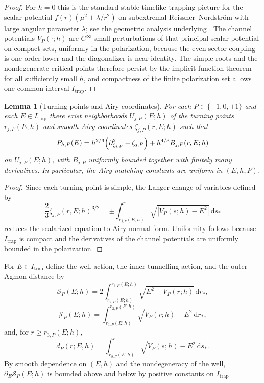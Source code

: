 \documentclass[12pt]{article}
\numberwithin{equation}{section}
\theoremstyle{plain}
\newtheorem{lemma}[theorem]{Lemma}
\theoremstyle{definition}
\theoremstyle{remark}
\newcommand{\dd}{\mathrm d}
\newcommand{\abs}[1]{\left|#1\right|}
\begin{document}
\begin{proof}
For $h=0$ this is the standard stable timelike trapping picture for the scalar potential $f(r)(\mu^2+\lambda/r^2)$ on subextremal Reissner--Nordstr\"om with large angular parameter $\lambda$; see the geometric analysis underlying \cite{ShlapentokhRothmanVanDeMoortel2026}.  The channel potentials $V_P(\cdot;h)$ are $C^\infty$-small perturbations of that principal scalar potential on compact sets, uniformly in the polarization, because the even-sector coupling is one order lower and the diagonalizer is near identity.  The simple roots and the nondegenerate critical points therefore persist by the implicit-function theorem for all sufficiently small $h$, and compactness of the finite polarization set allows one common interval $I_{\mathrm{trap}}$.
\end{proof}

\begin{lemma}[Turning points and Airy coordinates]\label{lem:qb_turning_points}
For each $P\in\{-1,0,+1\}$ and each $E\in I_{\mathrm{trap}}$ there exist neighborhoods $U_{j,P}(E;h)$ of the turning points $r_{j,P}(E;h)$ and smooth Airy coordinates $\zeta_{j,P}(r,E;h)$ such that
\[
   P_{h,P}(E)
   =
   h^{2/3}\Bigl(\partial_{\zeta_{j,P}}^2-\zeta_{j,P}\Bigr)
   +h^{4/3}B_{j,P}(r,E;h)
\]
on $U_{j,P}(E;h)$, with $B_{j,P}$ uniformly bounded together with finitely many derivatives.  In particular, the Airy matching constants are uniform in $(E,h,P)$.
\end{lemma}

\begin{proof}
Since each turning point is simple, the Langer change of variables defined by
\[
   \frac23\zeta_{j,P}(r,E;h)^{3/2}
   =
   \pm\int_{r_{j,P}(E;h)}^{r}\sqrt{\abs{V_P(s;h)-E^2}}\,\dd s_*
\]
reduces the scalarized equation to Airy normal form.  Uniformity follows because $I_{\mathrm{trap}}$ is compact and the derivatives of the channel potentials are uniformly bounded in the polarization.
\end{proof}

For $E\in I_{\mathrm{trap}}$ define the well action, the inner tunnelling action, and the outer Agmon distance by
\begin{equation}\label{eq:actions_def}
   \mathscr S_P(E;h)=2\int_{r_{2,P}(E;h)}^{r_{3,P}(E;h)}\sqrt{E^2-V_P(r;h)}\,\dd r_*,
\end{equation}
\begin{equation}\label{eq:tunnel_def}
   \mathscr J_P(E;h)=\int_{r_{1,P}(E;h)}^{r_{2,P}(E;h)}\sqrt{V_P(r;h)-E^2}\,\dd r_*,
\end{equation}
and, for $r\ge r_{3,P}(E;h)$,
\begin{equation}\label{eq:agmon_def}
   d_P(r;E,h)=\int_{r_{3,P}(E;h)}^{r}\sqrt{V_P(s;h)-E^2}\,\dd s_*.
\end{equation}
By smooth dependence on $(E,h)$ and the nondegeneracy of the well, $\partial_E\mathscr S_P(E;h)$ is bounded above and below by positive constants on $I_{\mathrm{trap}}$.
\end{document}
